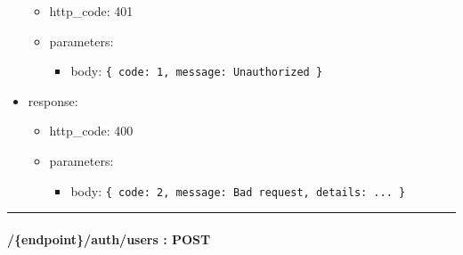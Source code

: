 \documentclass[
]{article}
\begin{document}
\begin{itemize}
  \begin{itemize}
  \item
    http\_code: 401
  \item
    parameters:

    \begin{itemize}
    \item
      body: \texttt{\{
      \textquotesingle{}code\textquotesingle{}:\ 1,\ 
      \textquotesingle{}message\textquotesingle{}:\ \textquotesingle{}Unauthorized\textquotesingle{}
      \}}
    \end{itemize}
  \end{itemize}
\item
  response:

  \begin{itemize}
  \item
    http\_code: 400
  \item
    parameters:

    \begin{itemize}
    \item
      body: \texttt{\{
      \textquotesingle{}code\textquotesingle{}:\ 2,
      \textquotesingle{}message\textquotesingle{}:\ \textquotesingle{}Bad\ request\textquotesingle{},
      \textquotesingle{}details\textquotesingle{}:\ \textquotesingle{}...\textquotesingle{}
      \}}
    \end{itemize}
  \end{itemize}
\end{itemize}

\begin{center}\rule{0.5\linewidth}{0.5pt}\end{center}

\hypertarget{header-n60805}{%
\paragraph{/\{endpoint\}/auth/users : POST}\label{header-n60805}}
\end{document}
